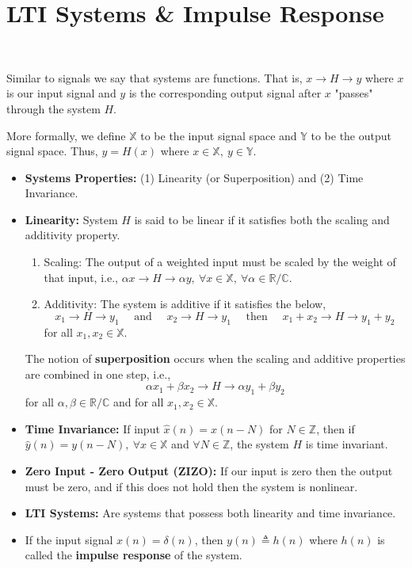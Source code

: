 \section{LTI Systems \& Impulse Response}
\begin{definition}[Systems]~

	Similar to signals we say that systems are functions. That is,
	$x\longrightarrow H \longrightarrow y$ where $x$ is our input
	signal and $y$ is the corresponding output signal after $x$
	"passes" through the system $H$.

	More formally, we define $\mathbb{X}$ to be the input signal space and
	$\mathbb{Y}$ to be the output signal space. Thus, $y = H(x)$ where
	$x \in \mathbb{X},\ y \in \mathbb{Y}$.
\end{definition}
\begin{itemize}
	\item \textbf{Systems Properties:} (1) Linearity (or Superposition) and
	      (2) Time Invariance.
	\item \textbf{Linearity:} System $H$ is said to be linear if
	      it satisfies both the scaling and additivity property.
	      \begin{enumerate}
		      \item Scaling: The output of a weighted input must be scaled by
		            the weight of that input, i.e.,
		            $\alpha x \longrightarrow H \longrightarrow \alpha y,\
			            \forall x \in \mathbb{X},\ \forall \alpha \in \mathbb{R}/\mathbb{C}$.
		      \item Additivity: The system is additive if it satisfies
		            the below,
		            \[
			            x_1 \longrightarrow H \longrightarrow y_1
			            \quad \text{ and } \quad
			            x_2 \longrightarrow H \longrightarrow{y_1}
			            \quad \text{ then } \quad
			            x_1 + x_2 \longrightarrow H \longrightarrow y_1 + y_2
		            \]
		            for all $x_1, x_2 \in \mathbb{X}$.
	      \end{enumerate}
	      The notion of \textbf{superposition} occurs when the scaling and
	      additive properties are combined in one step, i.e.,
	      \[
		      \alpha x_1 + \beta x_2 \longrightarrow H \longrightarrow \alpha y_1 + \beta y_2
	      \]
	      for all $\alpha, \beta \in \mathbb{R}/\mathbb{C}$ and for all
	      $x_1, x_2 \in \mathbb{X}$.
	\item \textbf{Time Invariance:} If input $\hat{x}(n) = x(n-N)$ for
	      $N \in \mathbb{Z}$, then if $\hat{y}(n) = y(n-N),\ \forall x \in \mathbb{X}$
	      and $\forall N \in \mathbb{Z}$, the system $H$ is time invariant.
	\item \textbf{Zero Input - Zero Output (ZIZO):} If our input is zero then
	      the output must be zero, and if this does not hold then the system
	      is nonlinear.
	\item \textbf{LTI Systems:} Are systems that possess both linearity and
	      time invariance.
	\item If the input signal $x(n) = \delta(n)$, then $y(n) \triangleq h(n)$
	      where $h(n)$ is called the \textbf{impulse response} of the system.
\end{itemize}
